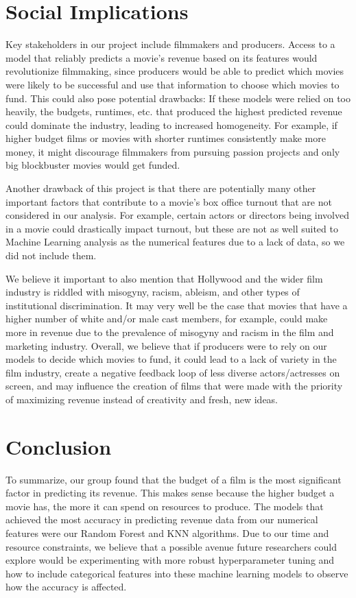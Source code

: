 \documentclass{article}
\begin{document}
\section{Social Implications}
\label{conclusion}

Key stakeholders in our project include filmmakers and producers. Access to a model that reliably predicts a movie's revenue based on its features would revolutionize filmmaking, since producers would be able to predict which movies were likely to be successful and use that information to choose which movies to fund. This could also pose potential drawbacks: If these models were relied on too heavily, the budgets, runtimes, etc. that produced the highest predicted revenue could dominate the industry, leading to increased homogeneity. For example, if higher budget films or movies with shorter runtimes consistently make more money, it might discourage filmmakers from pursuing passion projects and only big blockbuster movies would get funded. 

Another drawback of this project is that there are potentially many other important factors that contribute to a movie’s box office turnout that are not considered in our analysis. For example, certain actors or directors being involved in a movie could drastically impact turnout, but these are not as well suited to Machine Learning analysis as the numerical features due to a lack of data, so we did not include them.

We believe it important to also mention that Hollywood and the wider film industry is riddled with misogyny, racism, ableism, and other types of institutional discrimination. It may very well be the case that movies that have a higher number of white and/or male cast members, for example, could make more in revenue due to the prevalence of misogyny and racism in the film and marketing industry. Overall, we believe that if producers were to rely on our models to decide which movies to fund, it could lead to a lack of variety in the film industry, create a negative feedback loop of less diverse actors/actresses on screen, and may influence the creation of films that were made with the priority of maximizing revenue instead of creativity and fresh, new ideas.


\section{Conclusion}
To summarize, our group found that the budget of a film is the most significant factor in predicting its revenue. This makes sense because the higher budget a movie has, the more it can spend on resources to produce. The models that achieved the most accuracy in predicting revenue data from our numerical features were our Random Forest and KNN algorithms. Due to our time and resource constraints, we believe that a possible avenue future researchers could explore would be experimenting with more robust hyperparameter tuning and how to include categorical features into these machine learning models to observe how the accuracy is affected.
\label{conclusion}
\end{document}
